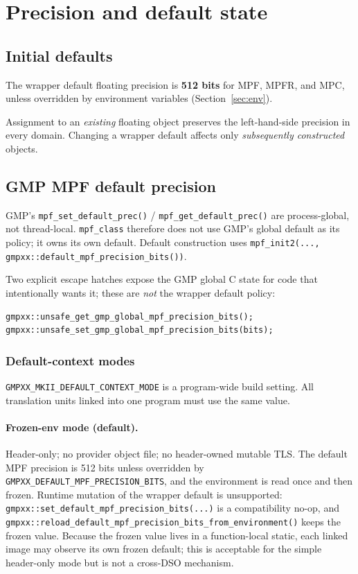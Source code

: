 \documentclass[11pt,a4paper]{article}
\newcommand{\code}[1]{\lstinline!#1!}
\begin{document}
\section{Precision and default state}

\subsection{Initial defaults}

The wrapper default floating precision is \textbf{512 bits} for MPF, MPFR, and
MPC, unless overridden by environment variables (Section~\ref{sec:env}).

Assignment to an \emph{existing} floating object preserves the
left-hand-side precision in every domain. Changing a wrapper default affects only
\emph{subsequently constructed} objects.

\subsection{GMP MPF default precision}

GMP's \code{mpf_set_default_prec()} / \code{mpf_get_default_prec()} are
process-global, not thread-local. \code{mpf_class} therefore does not use GMP's
global default as its policy; it owns its own default. Default construction uses
\code{mpf_init2(..., gmpxx::default_mpf_precision_bits())}.

Two explicit escape hatches expose the GMP global C state for code that
intentionally wants it; these are \emph{not} the wrapper default policy:

\begin{lstlisting}
gmpxx::unsafe_get_gmp_global_mpf_precision_bits();
gmpxx::unsafe_set_gmp_global_mpf_precision_bits(bits);
\end{lstlisting}

\subsubsection{Default-context modes}

\code{GMPXX_MKII_DEFAULT_CONTEXT_MODE} is a program-wide build setting. All
translation units linked into one program must use the same value.

\paragraph{Frozen-env mode (default).}
Header-only; no provider object file; no header-owned mutable TLS. The default
MPF precision is 512 bits unless overridden by
\code{GMPXX_DEFAULT_MPF_PRECISION_BITS}, and the environment is read once and
then frozen. Runtime mutation of the wrapper default is unsupported:
\code{gmpxx::set_default_mpf_precision_bits(...)} is a compatibility no-op,
and \code{gmpxx::reload_default_mpf_precision_bits_from_environment()} keeps the
frozen value. Because the frozen value lives in a function-local static, each
linked image may observe its own frozen default; this is acceptable for the
simple header-only mode but is not a cross-DSO mechanism.
\end{document}
